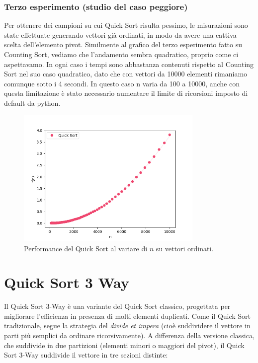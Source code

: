 \documentclass[a4paper, 12pt, oneside]{book}
\begin{document}
\subsection{Terzo esperimento (studio del caso peggiore)}

Per ottenere dei campioni su cui Quick Sort risulta pessimo, le misurazioni sono state effettuate generando vettori già ordinati, in modo da avere una cattiva scelta dell'elemento pivot. Similmente al grafico del terzo esperimento fatto su Counting Sort, vediamo che l'andamento sembra quadratico, proprio come ci aspettavamo. In ogni caso i tempi sono abbastanza contenuti rispetto al Counting Sort nel suo caso quadratico, dato che con vettori da 10000 elementi rimaniamo comunque sotto i 4 secondi. In questo caso n varia da 100 a 10000, anche con questa limitazione è stato necessario aumentare il limite di ricorsioni imposto di default da python.

\begin{figure}[H]
    \centering
    \includegraphics[width=0.8\textwidth]{images/quickSortCasoPeggiore.png}
    \caption{Performance del Quick Sort al variare di \(n\) su vettori ordinati.}
    \label{fig:quick_sort_n}
\end{figure}




\chapter{Quick Sort 3 Way}\label{chap:Quick Sort 3 Way} %

Il Quick Sort 3-Way è una variante del Quick Sort classico, progettata per migliorare l'efficienza in presenza di molti elementi duplicati. Come il Quick Sort tradizionale, segue la strategia del \textit{divide et impera} (cioè suddividere il vettore in parti più semplici da ordinare ricorsivamente).
A differenza della versione classica, che suddivide in due partizioni (elementi minori o maggiori del pivot), il Quick Sort 3-Way suddivide il vettore in tre sezioni distinte:
\end{document}
